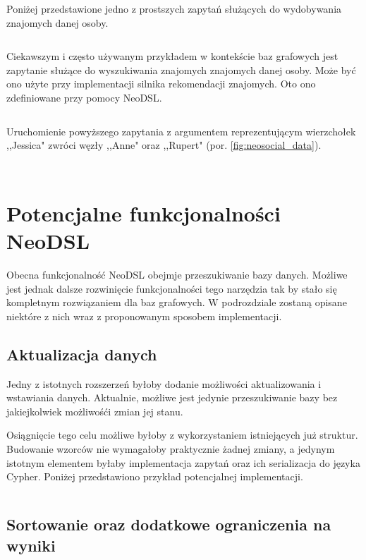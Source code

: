 \documentclass[brudnopis]{xmgr}
\begin{document}
Poniżej przedstawione jedno z prostszych zapytań służących do wydobywania znajomych danej osoby.

\inputminted{scala}{listings/scala/examples/socialnetwork/person-friends-query.scala}

Ciekawszym i często używanym przykładem w kontekście baz grafowych jest zapytanie służące do wyszukiwania znajomych znajomych danej osoby. Może być ono użyte przy implementacji silnika rekomendacji znajomych. Oto ono zdefiniowane przy pomocy NeoDSL.

\inputminted{scala}{listings/scala/examples/socialnetwork/person-fof-query.scala}

Uruchomienie powyższego zapytania z argumentem reprezentującym wierzchołek ,,Jessica" zwróci węzły ,,Anne" oraz ,,Rupert" (por. \ref{fig:neosocial_data}).

\inputminted{scala}{listings/scala/examples/socialnetwork/person-fof-result.scala}
\inputminted{text}{listings/text/person-fof-result.txt}

\section{Potencjalne funkcjonalności NeoDSL}

Obecna funkcjonalność NeoDSL obejmje przeszukiwanie bazy danych. Możliwe jest jednak dalsze rozwinięcie funkcjonalności tego narzędzia tak by stało się kompletnym rozwiązaniem dla baz grafowych. W podrozdziale zostaną opisane niektóre z nich wraz z proponowanym sposobem implementacji.

\subsection{Aktualizacja danych}

Jedny z istotnych rozszerzeń byłoby dodanie możliwości aktualizowania i wstawiania danych. Aktualnie, możliwe jest jedynie przeszukiwanie bazy bez jakiejkolwiek możliwośći zmian jej stanu. 

Osiągnięcie tego celu możliwe byłoby z wykorzystaniem istniejących już struktur. Budowanie wzorców nie wymagałoby praktycznie żadnej zmiany, a jedynym istotnym elementem byłaby implementacja zapytań oraz ich serializacja do języka Cypher. Poniżej przedstawiono przykład potencjalnej implementacji.

\inputminted{scala}{listings/scala/missing-features-update.scala}

\subsection{Sortowanie oraz dodatkowe ograniczenia na wyniki}
\end{document}
